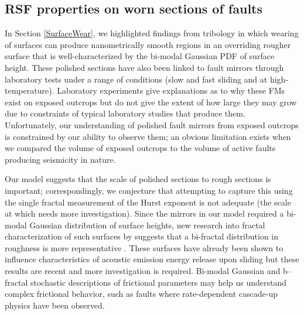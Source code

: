 \documentclass[preprint,1p, 10pt,authoryear]{elsarticle}
\begin{document}

\subsection{RSF properties on worn sections of faults}
\label{stochasticModelling}
In Section \ref{SurfaceWear}, we highlighted findings from tribology in which wearing of surfaces can produce nanometrically smooth regions in an overriding rougher surface that is well-characterized by the bi-modal Gaussian PDF of surface height. These polished sections have also been linked to fault mirrors through laboratory tests under a range of conditions (slow and fast sliding and at high-temperature). Laboratory experiments give explanations as to why these FMs exist on exposed outcrops but do not give the extent of how large they may grow due to constraints of typical laboratory studies that produce them. Unfortunately, our understanding of polished fault mirrors from exposed outcrops is constrained by our ability to observe them; an obvious limitation exists when we compared the volume of exposed outcrops to the volume of active faults producing seismicity in nature.  

Our model suggests that the scale of polished sections to rough sections is important; correspondingly, we conjecture that attempting to capture this using the single fractal measurement of the Hurst exponent is not adequate (the scale at which needs more investigation). Since the mirrors in our model required a bi-modal Gaussian distribution of surface heights, new research into fractal characterization of such surfaces by \citet{Hu2019} suggests that a bi-fractal distribution in roughness is more representative \citep{Leefe1998, Pawlus2008}. These surfaces have already been shown to influence characteristics of acoustic emission energy release upon sliding \citep{Fan2010, Hu2019a} but these results are recent and more investigation is required. Bi-modal Gaussian and b--fractal stochastic descriptions of frictional parameters may help us understand complex frictional behavior, such as faults where rate-dependent cascade-up physics have been observed.
\end{document}
